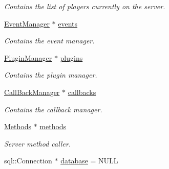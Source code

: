 \begin{DoxyCompactItemize}
\begin{DoxyCompactList}\small\item\em Contains the list of players currently on the server. \end{DoxyCompactList}\item 
\hypertarget{classManiaPP_a326ab543ab98eefcba8a4b616e794b96}{\hyperlink{classEventManager}{Event\-Manager} $\ast$ \hyperlink{classManiaPP_a326ab543ab98eefcba8a4b616e794b96}{events}}\label{classManiaPP_a326ab543ab98eefcba8a4b616e794b96}

\begin{DoxyCompactList}\small\item\em Contains the event manager. \end{DoxyCompactList}\item 
\hypertarget{classManiaPP_a199f7d80431e7f13e52e6010347f644a}{\hyperlink{classPluginManager}{Plugin\-Manager} $\ast$ \hyperlink{classManiaPP_a199f7d80431e7f13e52e6010347f644a}{plugins}}\label{classManiaPP_a199f7d80431e7f13e52e6010347f644a}

\begin{DoxyCompactList}\small\item\em Contains the plugin manager. \end{DoxyCompactList}\item 
\hypertarget{classManiaPP_af468d4b6eea93fd836950551eb7d3a01}{\hyperlink{classCallBackManager}{Call\-Back\-Manager} $\ast$ \hyperlink{classManiaPP_af468d4b6eea93fd836950551eb7d3a01}{callbacks}}\label{classManiaPP_af468d4b6eea93fd836950551eb7d3a01}

\begin{DoxyCompactList}\small\item\em Contains the callback manager. \end{DoxyCompactList}\item 
\hypertarget{classManiaPP_a48cb1ddf328d18361417986fe8ab069c}{\hyperlink{classMethods}{Methods} $\ast$ \hyperlink{classManiaPP_a48cb1ddf328d18361417986fe8ab069c}{methods}}\label{classManiaPP_a48cb1ddf328d18361417986fe8ab069c}

\begin{DoxyCompactList}\small\item\em Server method caller. \end{DoxyCompactList}\item 
\hypertarget{classManiaPP_ae2d403d9168ed624d1f877c85b3b38c7}{sql\-::\-Connection $\ast$ \hyperlink{classManiaPP_ae2d403d9168ed624d1f877c85b3b38c7}{database} = N\-U\-L\-L}\label{classManiaPP_ae2d403d9168ed624d1f877c85b3b38c7}


\end{DoxyCompactItemize}
